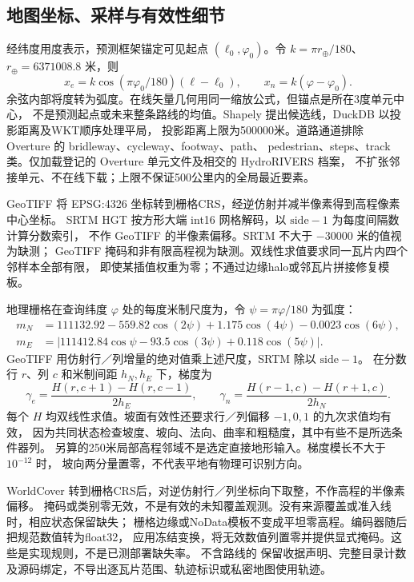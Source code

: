 \documentclass[UTF8,11pt]{ctexart}
\begin{document}
\subsection{地图坐标、采样与有效性细节}
\label{sec:map-query-details}
经纬度用度表示，预测框架锚定可见起点 \((\ell_0,\varphi_0)\)。令
\(k=\pi r_\oplus/180\)、\(r_\oplus=6371008.8\) 米，则
\begin{equation}
x_e=k\cos(\pi\varphi_0/180)(\ell-\ell_0),\qquad x_n=k(\varphi-\varphi_0).
\label{eq:map-frames}
\end{equation}
余弦内部将度转为弧度。在线矢量几何用同一缩放公式，但锚点是所在3度单元中心，
不是预测起点或未来整条路线的均值。Shapely 提出候选线，DuckDB 以投影距离及WKT顺序处理平局，
投影距离上限为500000米。道路通道排除 Overture 的 bridleway、cycleway、footway、path、
pedestrian、steps、track 类。仅加载登记的 Overture 单元文件及相交的 HydroRIVERS 档案，
不扩张邻接单元、不在线下载；上限不保证500公里内的全局最近要素。

GeoTIFF 将 EPSG:4326 坐标转到栅格CRS，经逆仿射并减半像素得到高程像素中心坐标。
SRTM HGT 按方形大端 int16 网格解码，以 \(\mathrm{side}-1\) 为每度间隔数计算分数索引，
不作 GeoTIFF 的半像素偏移。SRTM 不大于 \(-30000\) 米的值视为缺测；
GeoTIFF 掩码和非有限高程视为缺测。双线性求值要求同一瓦片内四个邻样本全部有限，
即使某插值权重为零；不通过边缘halo或邻瓦片拼接修复模板。

地理栅格在查询纬度 \(\varphi\) 处的每度米制尺度为，令 \(\psi=\pi\varphi/180\) 为弧度：
\begin{align}
m_N&=111132.92-559.82\cos(2\psi)+1.175\cos(4\psi)
      -0.0023\cos(6\psi),\nonumber\\
m_E&=\big|111412.84\cos\psi-93.5\cos(3\psi)+0.118\cos(5\psi)\big|.
\label{eq:dem-metric-spacing}
\end{align}
GeoTIFF 用仿射行／列增量的绝对值乘上述尺度，SRTM 除以 \(\mathrm{side}-1\)。
在分数行 \(r\)、列 \(c\) 和米制间距 \(h_N,h_E\) 下，梯度为
\begin{equation}
\gamma_e=\frac{H(r,c+1)-H(r,c-1)}{2h_E},\qquad
\gamma_n=\frac{H(r-1,c)-H(r+1,c)}{2h_N}.
\label{eq:dem-stencil}
\end{equation}
每个 \(H\) 均双线性求值。坡面有效性还要求行／列偏移 \(-1,0,1\) 的九次求值均有效，
因为共同状态检查坡度、坡向、法向、曲率和粗糙度，其中有些不是所选条件器列。
另算的250米局部高程邻域不是选定直接地形输入。梯度模长不大于 \(10^{-12}\) 时，
坡向两分量置零，不代表平地有物理可识别方向。

WorldCover 转到栅格CRS后，对逆仿射行／列坐标向下取整，不作高程的半像素偏移。
掩码或类别零无效，不是有效的未知覆盖观测。没有来源覆盖或准入线时，相应状态保留缺失；
栅格边缘或NoData模板不变成平坦零高程。编码器随后把规范数值转为float32，
应用冻结变换，将无效数值列置零并提供显式掩码。这些是实现规则，不是已测部署缺失率。
不含路线的  保留收据声明、完整目录计数
及源码绑定，不导出逐瓦片范围、轨迹标识或私密地图使用轨迹。
\end{document}
